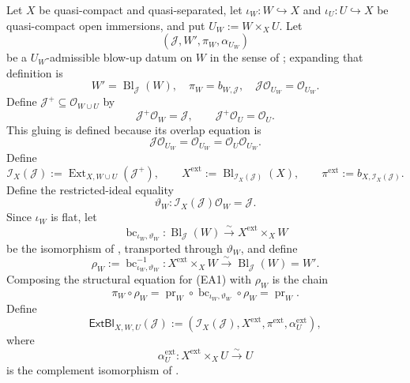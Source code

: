 \begin{definition}
  \label{def:nagata-extended-admissible-blowup}

  Let $X$ be quasi-compact and quasi-separated, let
  $\iota_W\colon W\hookrightarrow X$ and
  $\iota_U\colon U\hookrightarrow X$ be quasi-compact open immersions, and
  put $U_W:=W\times_XU$.  Let
  \[
    (\mathcal J,W',\pi_W,\alpha_{U_W})
  \]
  be a $U_W$-admissible blow-up datum on $W$ in the sense of
  ; expanding that definition is
  \[
    W'=\operatorname{Bl}_{\mathcal J}(W),\quad
    \pi_W=b_{W,\mathcal J},\quad
    \mathcal J\mathcal O_{U_W}=\mathcal O_{U_W}.
  \]
  Define $\mathcal J^+\subseteq\mathcal O_{W\cup U}$ by
  \[
    \mathcal J^+\mathcal O_W=\mathcal J,\qquad
    \mathcal J^+\mathcal O_U=\mathcal O_U.
  \]
  This gluing is defined because its overlap equation is
  \[
    \mathcal J\mathcal O_{U_W}
      =\mathcal O_{U_W}
      =\mathcal O_U\mathcal O_{U_W}.
  \]
  Define
  \[
    \mathcal I_{X}(\mathcal J)
      :=\operatorname{Ext}_{X,W\cup U}(\mathcal J^+),
    \qquad
    X^{\mathrm{ext}}
      :=\operatorname{Bl}_{\mathcal I_X(\mathcal J)}(X),
    \qquad
    \pi^{\mathrm{ext}}
      :=b_{X,\mathcal I_X(\mathcal J)}.
  \]
  Define the restricted-ideal equality
  \[
    \vartheta_W\colon
      \mathcal I_X(\mathcal J)\mathcal O_W=\mathcal J.             \tag{EA0}
  \]
  Since \(\iota_W\) is flat, let
  \[
    \operatorname{bc}_{\iota_W,\vartheta_W}\colon
      \operatorname{Bl}_{\mathcal J}(W)
        \xrightarrow{\sim}X^{\mathrm{ext}}\times_XW                \tag{EA1}
  \]
  be the isomorphism of
  , transported through
  \(\vartheta_W\), and define
  \[
    \rho_W:=\operatorname{bc}_{\iota_W,\vartheta_W}^{-1}
      \colon X^{\mathrm{ext}}\times_XW
        \xrightarrow{\sim}\operatorname{Bl}_{\mathcal J}(W)=W'.    \tag{EA2}
  \]
  Composing the structural equation for (EA1) with \(\rho_W\) is the chain
  \[
    \pi_W\circ\rho_W
      =\operatorname{pr}_W\circ
        \operatorname{bc}_{\iota_W,\vartheta_W}\circ\rho_W
      =\operatorname{pr}_W.                                      \tag{EA3}
  \]
  Define
  \[
    \mathsf{ExtBl}_{X,W,U}(\mathcal J)
      :=(\mathcal I_X(\mathcal J),X^{\mathrm{ext}},
         \pi^{\mathrm{ext}},\alpha_U^{\mathrm{ext}}),
  \]
  where
  \[
    \alpha_U^{\mathrm{ext}}\colon
      X^{\mathrm{ext}}\times_XU\xrightarrow{\sim}U
  \]
  is the complement isomorphism of
  .
\end{definition}

